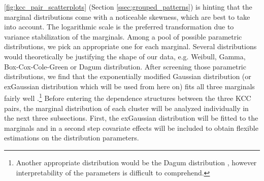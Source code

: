 
\autoref{fig:kcc_pair_scatterplots} (Section \ref{ssec:grouped_patterns}) is hinting that the marginal distributions come with a noticeable skewness, which are best to take into account. The logarithmic scale is the preferred transformation due to variance stabilization of the marginals. Among a pool of possible parametric distributions, we pick an appropriate one for each marginal. Several distributions would theoretically be justifying the shape of our data, e.g. Weibull, Gamma, Box-Cox-Cole-Green or Dagum distribution. After screening those parametric distributions, we find that the exponentially modified Gaussian distribution (or exGaussian distribution which will be used from here on) fits all three marginals fairly well \citep{grushka1972characterization}.\footnote{Another appropriate distribution would be the Dagum distribution \citep{dagum1975model}, however interpretability of the parameters is difficult to comprehend.} 
Before entering the dependence structures between the three \ac{KCC} pairs, the marginal distribution of each cluster will be analyzed individually in the next three subsections. First, the exGaussian distribution will be fitted to the marginals and in a second step covariate effects will be included to obtain flexible estimations on the distribution parameters.







